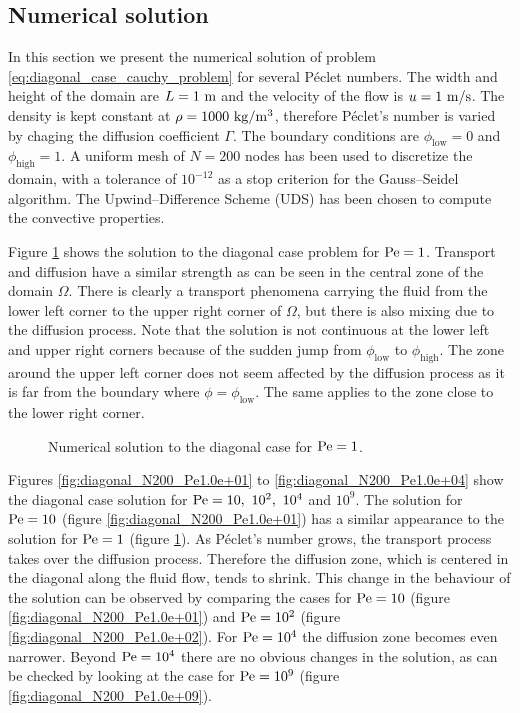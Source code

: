 
\subsection{Numerical solution}

In this section we present the numerical solution of problem \eqref{eq:diagonal_case_cauchy_problem} for several Péclet numbers. The width and height of the domain are $L = 1 \ \meter$ and the velocity of the flow is $u = 1 \ \meter / \second$. The density is kept constant at $\rho = 1000 \ \kilo\gram / \meter^3$, therefore Péclet's number is varied by chaging the diffusion coefficient $\Gamma$. The boundary conditions are $\phi_\text{low} = 0$ and $\phi_\text{high} = 1$. A uniform mesh of $N = 200$ nodes has been used to discretize the domain, with a tolerance of $10^{-12}$ as a stop criterion for the Gauss--Seidel algorithm. The Upwind--Difference Scheme (UDS) has been chosen to compute the convective properties.

Figure \ref{fig:diagonal_N200_Pe1.0e+00} shows the solution to the diagonal case problem for $\peclet = 1$. Transport and diffusion have a similar strength as can be seen in the central zone of the domain $\Omega$. There is clearly a transport phenomena carrying the fluid from the lower left corner to the upper right corner of $\Omega$, but there is also mixing due to the diffusion process. Note that the solution is not continuous at the lower left and upper right corners because of the sudden jump from $\phi_\text{low}$ to $\phi_\text{high}$. The zone around the upper left corner does not seem affected by the diffusion process as it is far from the boundary where $\phi = \phi_\text{low}$. The same applies to the zone close to the lower right corner.

\begin{figure}[h]
	\centering
	\vspace{-0.75cm}
	
	\vspace{-0.50cm}
	\caption{Numerical solution to the diagonal case for $\peclet = 1$.}
	\label{fig:diagonal_N200_Pe1.0e+00}
\end{figure}

\clearpage
Figures \eqref{fig:diagonal_N200_Pe1.0e+01} to \eqref{fig:diagonal_N200_Pe1.0e+04} show the diagonal case solution for $\peclet = 10, \ 10^2, \ 10^4$ and $10^9$. The solution for $\peclet = 10$ (figure \ref{fig:diagonal_N200_Pe1.0e+01}) has a similar appearance to the solution for $\peclet = 1$ (figure \ref{fig:diagonal_N200_Pe1.0e+00}). As Péclet's number grows, the transport process takes over the diffusion process. Therefore the diffusion zone, which is centered in the diagonal along the fluid flow, tends to shrink. This change in the behaviour of the solution can be observed by comparing the cases for $\peclet = 10$ (figure \ref{fig:diagonal_N200_Pe1.0e+01}) and $\peclet = 10^2$ (figure \ref{fig:diagonal_N200_Pe1.0e+02}). For $\peclet = 10^4$ the diffusion zone becomes even narrower. Beyond $\peclet = 10^4$ there are no obvious changes in the solution, as can be checked by looking at the case for $\peclet = 10^9$ (figure \ref{fig:diagonal_N200_Pe1.0e+09}).

